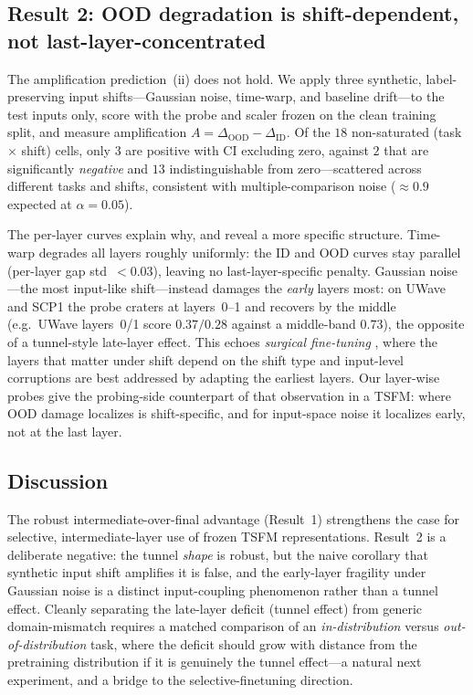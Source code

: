 \subsection{Result 2: OOD degradation is shift-dependent, not last-layer-concentrated}
The amplification prediction~(ii) does not hold. We apply three synthetic, label-preserving
input shifts---Gaussian noise, time-warp, and baseline drift---to the test inputs only,
score with the probe and scaler frozen on the clean training split, and measure amplification
$A = \Delta_{\mathrm{OOD}} - \Delta_{\mathrm{ID}}$. Of the $18$ non-saturated
(task $\times$ shift) cells, only $3$ are positive with CI excluding zero, against $2$ that
are significantly \emph{negative} and $13$ indistinguishable from zero---scattered across
different tasks and shifts, consistent with multiple-comparison noise ($\approx0.9$ expected
at $\alpha{=}0.05$).

The per-layer curves explain why, and reveal a more specific structure. Time-warp degrades
all layers roughly uniformly: the ID and OOD curves stay parallel (per-layer gap
std~$<0.03$), leaving no last-layer-specific penalty. Gaussian noise---the most input-like
shift---instead damages the \emph{early} layers most: on UWave and SCP1 the probe craters at
layers~0--1 and recovers by the middle (e.g.\ UWave layers~0/1 score $0.37/0.28$ against a
middle-band $0.73$), the opposite of a tunnel-style late-layer effect. This echoes
\emph{surgical fine-tuning} \cite{lee2022surgical}, where the layers that matter under shift
depend on the shift type and input-level corruptions are best addressed by adapting the
earliest layers. Our layer-wise probes give the probing-side counterpart of that observation
in a TSFM: where OOD damage localizes is shift-specific, and for input-space noise it
localizes early, not at the last layer.

\subsection{Discussion}
The robust intermediate-over-final advantage (Result~1) strengthens the case for selective,
intermediate-layer use of frozen TSFM representations. Result~2 is a deliberate negative: the
tunnel \emph{shape} is robust, but the naive corollary that synthetic input shift amplifies
it is false, and the early-layer fragility under Gaussian noise is a distinct input-coupling
phenomenon rather than a tunnel effect. Cleanly separating the late-layer deficit (tunnel
effect) from generic domain-mismatch requires a matched comparison of an \emph{in-distribution}
versus \emph{out-of-distribution} task, where the deficit should grow with distance from the
pretraining distribution if it is genuinely the tunnel effect---a natural next experiment, and
a bridge to the selective-finetuning direction.


